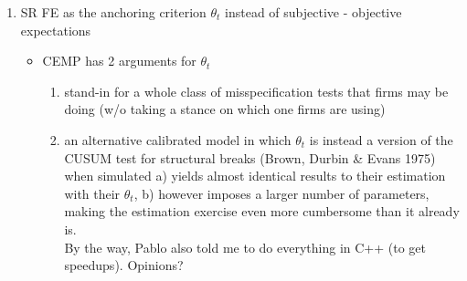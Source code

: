 \documentclass[11pt]{article}
\def \myFigPath {../figures/}
\renewcommand{\[}{\begin{equation}}
\renewcommand{\]}{\end{equation}}
\def\myBiggerFigScale{0.4}
\def\myFigScale{0.3}
\begin{document}
\begin{enumerate}
\item SR FE as the anchoring criterion $\theta_t$ instead of subjective - objective expectations
	\begin{itemize}
	\item  CEMP has 2 arguments for $\theta_t$ 
		\begin{enumerate}
		\item stand-in for a whole class of misspecification tests that firms may be doing (w/o taking a stance on which one firms are using)
		\item an alternative calibrated model in which $\theta_t$ is instead a version of the CUSUM test for structural breaks (Brown, Durbin \& Evans 1975) when simulated a) yields almost identical results to their estimation with their $\theta_t$, b) however imposes a larger number of parameters, making the estimation exercise even more cumbersome than it already is. \\
		By the way, Pablo also told me to do everything in C++ (to get speedups). Opinions?
		\end{enumerate}
	\end{itemize}
\end{enumerate}



%
\end{document}

